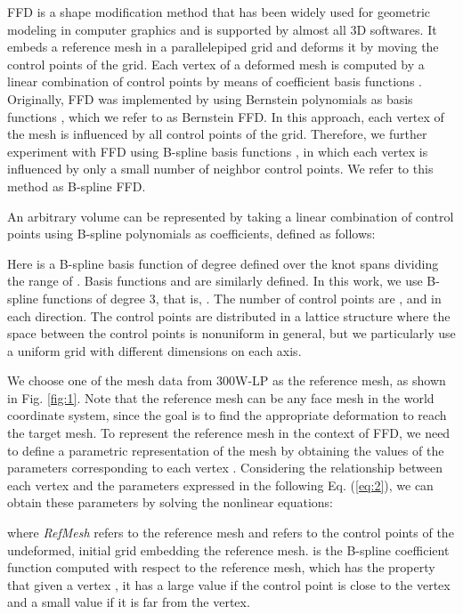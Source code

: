 \documentclass[letterpaper, 10 pt, conference]{ieeeconf}
\begin{document}
FFD is a shape modification method that has been widely used for geometric modeling in computer graphics and is supported by almost all 3D softwares. It embeds a reference mesh in a parallelepiped grid and deforms it by moving the control points of the grid. Each vertex of a deformed mesh is computed by a linear combination of control points by means of coefficient basis functions \cite{hsu1992direct}. Originally, FFD was implemented by using Bernstein polynomials as basis functions \cite{sederberg1986free}, which we refer to as Bernstein FFD. In this approach, each vertex of the mesh is influenced by all control points of the grid. Therefore, we further experiment with FFD using B-spline basis functions \cite{hsu1992direct}, in which each vertex is influenced by only a small number of neighbor control points. We refer to this method as B-spline FFD.
\par

An arbitrary volume  can be represented by taking a linear combination of control points using B-spline polynomials as coefficients, defined as follows:


Here  is a B-spline basis function of degree  defined over the knot spans dividing the range of . Basis functions  and   are similarly defined. In this work, we use B-spline functions of degree 3, that is, . The number of control points are , and  in each direction. The control points  are distributed in a lattice structure where the space between the control points is nonuniform in general, but we particularly use a uniform grid with different dimensions on each axis.

We choose one of the mesh data from 300W-LP \cite{zhu2016face} as the reference mesh, as shown in Fig. \ref{fig:1}. Note that the reference mesh can be any face mesh in the world coordinate system, since the goal is to find the appropriate deformation to reach the target mesh. To represent the reference mesh in the context of FFD, we need to define a parametric representation of the mesh by obtaining the values of the parameters  corresponding to each vertex . Considering the relationship between each vertex and the parameters expressed in the following Eq. (\ref{eq:2}), we can obtain these parameters by solving the nonlinear equations:


where \emph{RefMesh} refers to the reference mesh and  refers to the control points of the undeformed, initial grid embedding the reference mesh.
 is the B-spline coefficient function computed with respect to the reference mesh, which has the property that given a vertex , it has a large value if the control point  is close to the vertex and a small value if it is far from the vertex.
\end{document}
